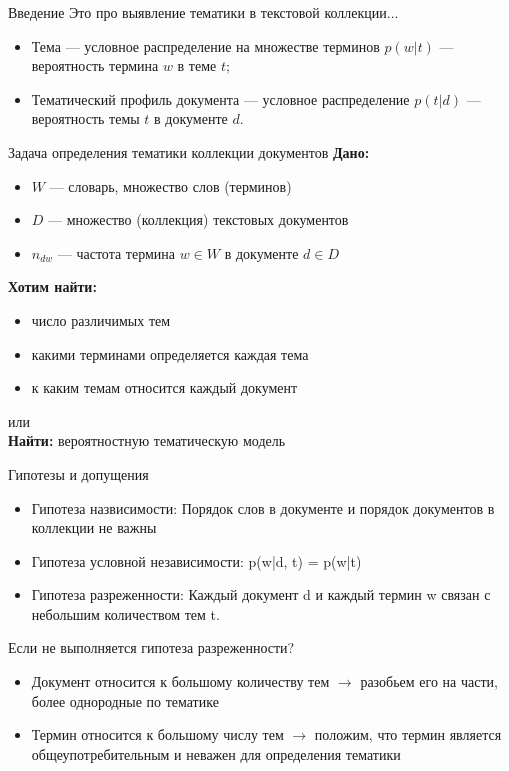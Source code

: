 \documentclass{beamer}
\begin{document}
\begin{frame}{Введение}
   Это про выявление тематики в текстовой коллекции...
   \begin{itemize}
       \item  Тема --- условное распределение на множестве терминов $p(w|t)$ --- вероятность термина $w$ в теме $t$;
       \item Тематический профиль документа --- условное распределение $p(t|d)$ --- вероятность темы $t$ в документе $d$.
   \end{itemize}
\end{frame}

\begin{frame}{Задача определения тематики коллекции документов}
\textbf{Дано:}
\begin{itemize}
    \item $W$ --- словарь, множество слов (терминов)
    \item $D$ --- множество (коллекция) текстовых документов
    \item $n_{dw}$ --- частота термина $w \in W$ в документе $d \in D$
\end{itemize}
\vspace{4\ex}
\textbf{Хотим найти:}
\begin{itemize}
    \item число различимых тем\\
    \item какими терминами определяется каждая тема\\
    \item к каким темам относится каждый документ\\
\end{itemize}
или\\
\textbf{Найти:} вероятностную тематическую модель
\end{frame}

\begin{frame}{Гипотезы и допущения}
\begin{itemize}
    \item Гипотеза назвисимости: Порядок слов в документе и порядок документов в коллекции не важны
    \item Гипотеза условной независимости: p(w|d, t) = p(w|t)
    \item Гипотеза разреженности: Каждый документ d и каждый термин w связан с небольшим количеством тем t.
\end{itemize}
\vspace{2\ex}
Если не выполняется гипотеза разреженности?
\begin{itemize}
    \item Документ относится к большому количеству тем $\rightarrow$ разобьем его на части, более однородные по тематике
    \item Термин относится к большому числу тем $\rightarrow$ положим, что термин является общеупотребительным и неважен для определения тематики
\end{itemize}
\end{frame}
\end{document}
